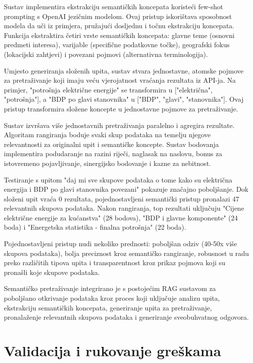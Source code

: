 Sustav implementira ekstrakciju semantičkih koncepata koristeći few-shot prompting s OpenAI jezičnim modelom. Ovaj pristup iskorištava sposobnost modela da uči iz primjera, pružajući dosljednu i točnu ekstrakciju koncepata. Funkcija ekstraktira četiri vrste semantičkih koncepata: glavne teme (osnovni predmeti interesa), varijable (specifične podatkovne točke), geografski fokus (lokacijski zahtjevi) i povezani pojmovi (alternativna terminologija).

Umjesto generiranja složenih upita, sustav stvara jednostavne, atomske pojmove za pretraživanje koji imaju veću vjerojatnost vraćanja rezultata iz API-ja. Na primjer, "potrošnja električne energije" se transformira u ["električna", "potrošnja"], a "BDP po glavi stanovnika" u ["BDP", "glavi", "stanovnika"]. Ovaj pristup transformira složene koncepte u jednostavne pojmove za pretraživanje.

Sustav izvršava više jednostavnih pretraživanja paralelno i agregira rezultate. Algoritam rangiranja boduje svaki skup podataka na temelju njegove relevantnosti za originalni upit i semantičke koncepte. Sustav bodovanja implementira podudaranje na razini riječi, naglasak na naslovu, bonus za istovremeno pojavljivanje, sinergijsko bodovanje i kazne za nebitnost.

Testiranje s upitom "daj mi sve skupove podataka o tome kako su električna energija i BDP po glavi stanovnika povezani" pokazuje značajno poboljšanje. Dok složeni upit vraća 0 rezultata, pojednostavljeni semantički pristup pronalazi 47 relevantnih skupova podataka. Nakon rangiranja, top rezultati uključuju "Cijene električne energije za kućanstva" (28 bodova), "BDP i glavne komponente" (24 boda) i "Energetska statistika - finalna potrošnja" (22 boda).

Pojednostavljeni pristup nudi nekoliko prednosti: poboljšan odziv (40-50x više skupova podataka), bolja preciznost kroz semantičko rangiranje, robusnost u radu preko različitih tipova upita i transparentnost kroz prikaz pojmova koji su pronašli koje skupove podataka.

Semantičko pretraživanje integrirano je s postojećim RAG sustavom za poboljšano otkrivanje podataka kroz proces koji uključuje analizu upita, ekstrakciju semantičkih koncepata, generiranje upita za pretraživanje, pronalaženje relevantnih skupova podataka i generiranje sveobuhvatnog odgovora.

\section{Validacija i rukovanje greškama}
\label{sec:validation}

